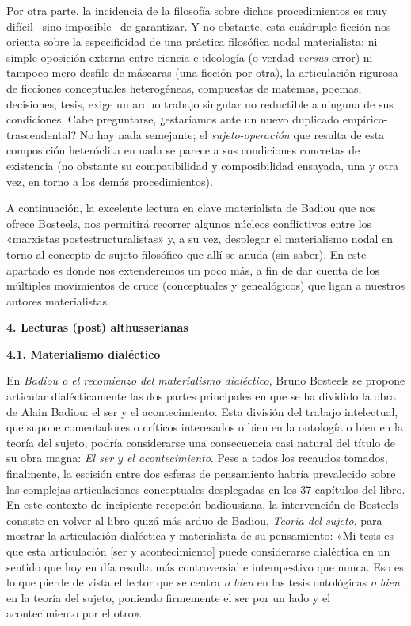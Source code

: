 Por otra parte, la incidencia de la filosofía sobre dichos procedimientos es muy difícil --sino imposible-- de garantizar. Y no obstante, esta cuádruple ficción nos orienta sobre la especificidad de una práctica filosófica nodal materialista: ni simple oposición externa entre ciencia e ideología (o verdad \emph{versus} error) ni tampoco mero desfile de máscaras (una ficción por otra), la articulación rigurosa de ficciones conceptuales heterogéneas, compuestas de matemas, poemas, decisiones, tesis, exige un arduo trabajo singular no reductible a ninguna de sus condiciones. Cabe preguntarse, ¿estaríamos ante un nuevo duplicado empírico-trascendental? No hay nada semejante; el \emph{sujeto-operación} que resulta de esta composición heteróclita en nada se parece a sus condiciones concretas de existencia (no obstante su compatibilidad y composibilidad ensayada, una y otra vez, en torno a los demás procedimientos).

A continuación, la excelente lectura en clave materialista de Badiou que nos ofrece Bosteels, nos permitirá recorrer algunos núcleos conflictivos entre los «marxistas postestructuralistas» y, a su vez, desplegar el materialismo nodal en torno al concepto de sujeto filosófico que allí se anuda (sin saber). En este apartado es donde nos extenderemos un poco más, a fin de dar cuenta de los múltiples movimientos de cruce (conceptuales y genealógicos) que ligan a nuestros autores materialistas.

\textbf{4. Lecturas (post) althusserianas}

\textbf{4.1. Materialismo dialéctico}

En \emph{Badiou o el recomienzo del materialismo dialéctico}, Bruno Bosteels se propone articular dialécticamente las dos partes principales en que se ha dividido la obra de Alain Badiou: el ser y el acontecimiento. Esta división del trabajo intelectual, que supone comentadores o críticos interesados o bien en la ontología o bien en la teoría del sujeto, podría considerarse una consecuencia casi natural del título de su obra magna: \emph{El ser y el acontecimiento}. Pese a todos los recaudos tomados, finalmente, la escisión entre dos esferas de pensamiento habría prevalecido sobre las complejas articulaciones conceptuales desplegadas en los 37 capítulos del libro. En este contexto de incipiente recepción badiousiana, la intervención de Bosteels consiste en volver al libro quizá más arduo de Badiou, \emph{Teoría del sujeto}, para mostrar la articulación dialéctica y materialista de su pensamiento: «Mi tesis es que esta articulación {[}ser y acontecimiento{]} puede considerarse dialéctica en un sentido que hoy en día resulta más controversial e intempestivo que nunca. Eso es lo que pierde de vista el lector que se centra \emph{o bien} en las tesis ontológicas \emph{o bien} en la teoría del sujeto, poniendo firmemente el ser por un lado y el acontecimiento por el otro».

